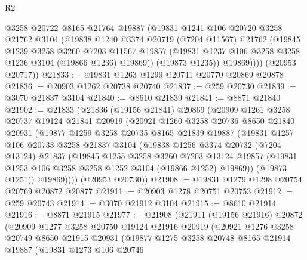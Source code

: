\begin{lexlean}{R2}
\begin{coremodule}
            @3258
            @20722
            @8165
            @21764
            @19887
            (@19831
              @1241
              @106
              @20720
              @3258
              @21762
              @3104
              (@19838
                @1240
                @3374
                @20719
                (@7204 @11567)
                @21762
                (@19845
                  @1239
                  @3258
                  @3260
                  @7203
                  @11567
                  @19857
                  (@19831 @1237 @106 @3258 @3258 @1236 @3104 (@19866 @1236) @19869))
                (@19873 @1235))
              @19869))))
      (@20953 @20717))
@21833 := @19831 @1263 @1299 @20741 @20770 @20869 @20878
@21836 := @20903 @1262 @20738 @20740
@21837 := @259 @20730
@21839 := @3070 @21837 @3104
@21840 := @8610 @21839
@21841 := @8871 @21840
@21902 := @21833
    (@21836
      (@19156 @21841)
      @20869
      (@20909
        @1261
        @3258
        @20737
        @19124
        @21841
        @20919
        (@20921
          @1260
          @3258
          @20736
          @8650
          @21840
          @20931
          (@19877
            @1259
            @3258
            @20735
            @8165
            @21839
            @19887
            (@19831
              @1257
              @106
              @20733
              @3258
              @21837
              @3104
              (@19838
                @1256
                @3374
                @20732
                (@7204 @13124)
                @21837
                (@19845
                  @1255
                  @3258
                  @3260
                  @7203
                  @13124
                  @19857
                  (@19831 @1253 @106 @3258 @3258 @1252 @3104 (@19866 @1252) @19869))
                (@19873 @1251))
              @19869))))
      (@20953 @20730))
@21908 := @19831 @1279 @1298 @20754 @20769 @20872 @20877
@21911 := @20903 @1278 @20751 @20753
@21912 := @259 @20743
@21914 := @3070 @21912 @3104
@21915 := @8610 @21914
@21916 := @8871 @21915
@21977 := @21908
    (@21911
      (@19156 @21916)
      @20872
      (@20909
        @1277
        @3258
        @20750
        @19124
        @21916
        @20919
        (@20921
          @1276
          @3258
          @20749
          @8650
          @21915
          @20931
          (@19877
            @1275
            @3258
            @20748
            @8165
            @21914
            @19887
            (@19831
              @1273
              @106
              @20746

\end{coremodule}
\end{lexlean}

